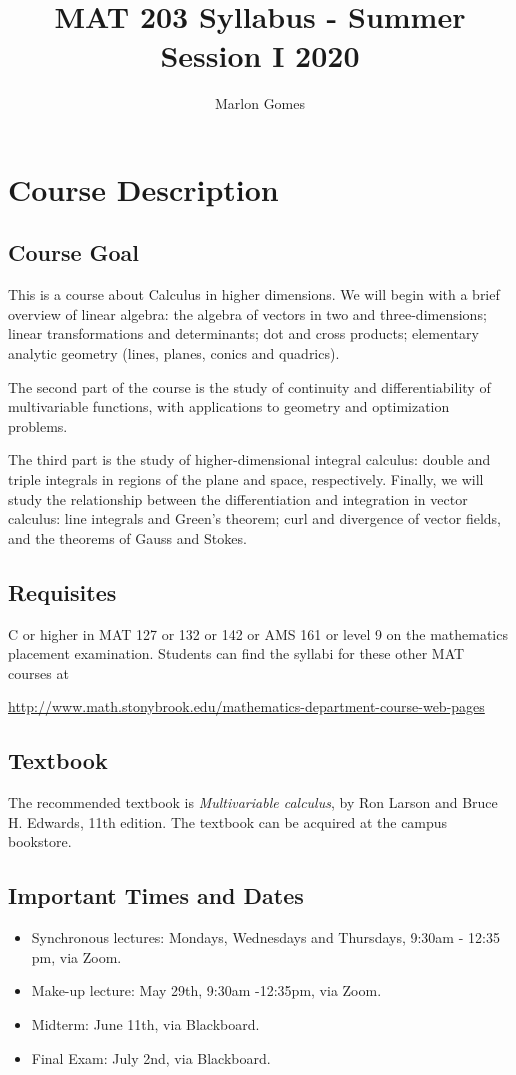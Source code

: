 \documentclass[11pt]{amsart}
\title[MAT 203 Syllabus - Summer 2020]{MAT 203 Syllabus - Summer Session I 2020}
\author[M. Gomes]{Marlon Gomes}
\numberwithin{equation}{section}
\begin{document}
\maketitle

\section{Course Description}
\subsection{Course Goal}
This is a course about Calculus in higher dimensions. We will begin with a brief overview of linear algebra: the algebra of vectors in two and three-dimensions; linear transformations and determinants; dot and cross products; elementary analytic geometry (lines, planes, conics and quadrics).

The second part of the course is the study of continuity and differentiability of multivariable functions, with applications to geometry and optimization problems.
 
The third part is the study of higher-dimensional integral calculus: double and triple integrals in regions of the plane and space, respectively.
Finally, we will study the relationship between the differentiation and integration in vector calculus: line integrals and Green's theorem; curl and divergence of vector fields, and the theorems of Gauss and Stokes. 

\subsection{Requisites}
C or higher in MAT 127 or 132 or 142 or AMS 161 or level 9 on the mathematics placement examination. Students can find the syllabi for these other MAT courses at 
\begin{center}
\url{http://www.math.stonybrook.edu/mathematics-department-course-web-pages}
\end{center}

\subsection{Textbook}
The recommended textbook is \textit{Multivariable calculus}, by Ron Larson and Bruce H. Edwards, 11th edition. The textbook can be acquired at the campus bookstore. 

\subsection{Important Times and Dates}
\begin{itemize}
\item Synchronous lectures: Mondays, Wednesdays and Thursdays, 9:30am - 12:35 pm, via Zoom.
\item Make-up lecture: May 29th, 9:30am -12:35pm, via Zoom.
\item Midterm: June 11th, via Blackboard.
\item Final Exam: July 2nd, via Blackboard. 
\end{itemize}
\end{document}

